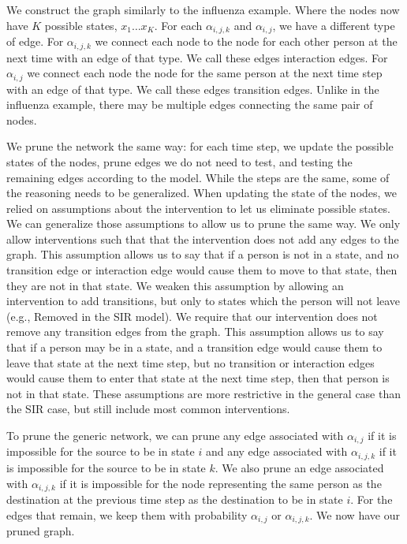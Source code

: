 \documentclass[PTRSB]{rsos}
\begin{document}
We construct the graph similarly to the influenza example.
Where the nodes now have $K$ possible states, $x_1 \dots x_K$.
For each $\alpha_{i,j,k}$ and $\alpha_{i,j}$, we have a different type of edge.
For $\alpha_{i,j,k}$ we connect each node to the node for each other person at the next time with an edge of that type.
We call these edges interaction edges.
For $\alpha_{i,j}$ we connect each node the node for the same person at the next time step with an edge of that type.
We call these edges transition edges.
Unlike in the influenza example, there may be multiple edges connecting the same pair of nodes.

We prune the network the same way: for each time step, we update the possible states of the nodes, prune edges we do not need to test, and testing the remaining edges according to the model.
While the steps are the same, some of the reasoning needs to be generalized.
When updating the state of the nodes, we relied on assumptions about the intervention to let us eliminate possible states.
We can generalize those assumptions to allow us to prune the same way.
We only allow interventions such that that the intervention does not add any edges to the graph.
This assumption allows us to say that if a person is not in a state, and no transition edge or interaction edge would cause them to move to that state, then they are not in that state.
We weaken this assumption by allowing an intervention to add transitions, but only to states which the person will not leave (e.g., Removed in the SIR model).
We require that our intervention does not remove any transition edges from the graph.
This assumption allows us to say that if a person may be in a state, and a transition edge would cause them to leave that state at the next time step, but no transition or interaction edges would cause them to enter that state at the next time step, then that person is not in that state. %
These assumptions are more restrictive in the general case than the SIR case, but still include most common interventions.

To prune the generic network, we can prune any edge associated with $\alpha_{i,j}$ if it is impossible for the source to be in state $i$ and any edge associated with $\alpha_{i,j,k}$ if it is impossible for the source to be in state $k$.
We also prune an edge associated with $\alpha_{i,j,k}$ if it is impossible for the node representing the same person as the destination at the previous time step as the destination to be in state $i$. %
For the edges that remain, we keep them with probability $\alpha_{i,j}$ or $\alpha_{i,j,k}$.
We now have our pruned graph.
\end{document}
